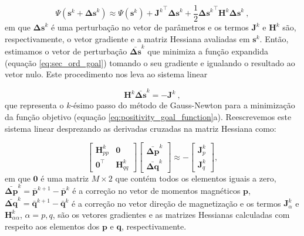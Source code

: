 \begin{equation}
\Psi(\mathbf{s}^{k} + \mathbf{\Delta s}^{k}) \approx \Psi(\mathbf{s}^{k}) + 
{\mathbf{J}^{k}}^{\top} \mathbf{\Delta s}^{k} + 
\frac{1}{2} {\mathbf{\Delta s}^{k}}^{\top} \mathbf{H}^{k} \mathbf{\Delta s}^{k}  \: ,
\label{eq:sec_ord_goal}
\end{equation}
em que $\mathbf{\Delta s}^{k}$ é uma perturbação no vetor de parâmetros e os termos $\mathbf{J}^{k}$ e $\mathbf{H}^{k}$ são, respectivamente, o vetor gradiente e a matriz Hessiana avaliadas em $\mathbf{s}^{k}$. Então, estimamos o vetor de perturbação $\bar{\mathbf{\Delta s}}^k$ que minimiza a função expandida (equação \ref{eq:sec_ord_goal}) tomando o seu gradiente e igualando o resultado ao vetor nulo. Este procedimento nos leva ao sistema linear 

\begin{equation}
\mathbf{H}^{k} \bar{\mathbf{\Delta s}}^{k} = - \mathbf{J}^{k} \: ,
\label{eq:linear_sys_GN}
\end{equation}
que representa o $k$-ésimo passo do método de Gauss-Newton \citep{aster2005} para a minimização da função objetivo (equação \ref{eq:positivity_goal_function}a). Reescrevemos este sistema linear desprezando as derivadas cruzadas na matriz Hessiana como: 

\begin{equation}
\left[
\begin{array}{c|c}
\mathbf{H}_{pp}^{k} & \mathbf{0} \\
\hline
\mathbf{0}^{\top} & \mathbf{H}_{qq}^{k}
\end{array}
\right] \left[ \begin{array}{c}
\bar{\mathbf{\Delta p}}^{k} \\ 
\bar{\mathbf{\Delta q}}^{k} 
\end{array} \right] \approx -\left[ \begin{array}{c}
\mathbf{J}_{p}^{k} \\ 
\mathbf{J}_{q}^{k} 
\end{array} \right] ,
\label{eq:linear_sys_GN_block}
\end{equation}
em que $\mathbf{0}$ é uma matriz $M \times 2$ que contém todos os elementos iguais a zero, $\bar{\mathbf{\Delta p}}^{k} = \bar{\mathbf{p}}^{k+1} - \bar{\mathbf{p}}^{k}$ é a correção no vetor de momentos magnéticos $\mathbf{p}$, $\bar{\mathbf{\Delta q}}^{k} = \bar{\mathbf{q}}^{k+1} - \bar{\mathbf{q}}^{k}$ é a correção no vetor direção de magnetização e os termos $\mathbf{J}_{\alpha}^{k}$ e $\mathbf{H}_{\alpha \alpha}^{k}$, $\alpha = p,q$, são os vetores gradientes e as matrizes Hessianas calculadas com respeito aos elementos dos $\mathbf{p}$ e $\mathbf{q}$, respectivamente. 

